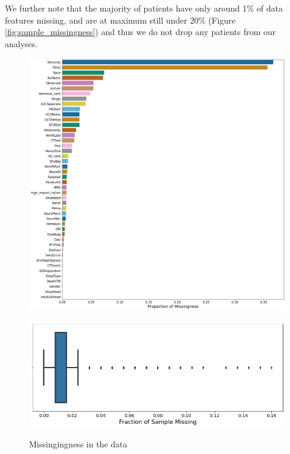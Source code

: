 \documentclass[11pt, letterpaper]{amsart}
\begin{document}
We further note that the majority of patients have only around 1\% of data features missing, and are at maximum still under 20\% (Figure \ref{fig:sample_missingness}) and thus we do not drop any patients from our analyses.
\begin{figure}
	\begin{minipage}[b]{0.5\linewidth}
		\centering
		\includegraphics[width=\textwidth]{covariate_missingness.png}
		\label{fig:cov_missing}
	\end{minipage}
	\begin{minipage}[b]{0.5\linewidth}
		\centering
		\includegraphics[width=\textwidth]{sample_missingness.png}
		\label{fig:sample_missingness}
	\end{minipage}
	\caption{Missingingness in the data}\label{fig:missing_agg}
\end{figure}
\end{document}
